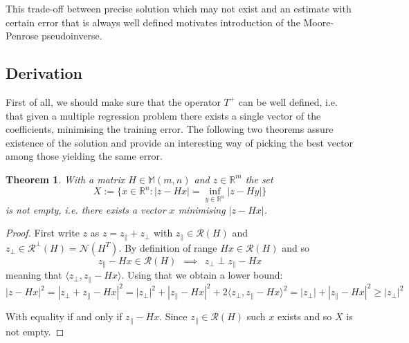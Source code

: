 \documentclass[a4paper,11pt]{article}
\theoremstyle{break}
\newtheorem{theorem}{Theorem}[section]
\newcommand{\R}{\mathbb{R}}
\newcommand{\Nu}{\mathcal{N}}
\newcommand{\Ra}{\mathcal{R}}
\newcommand{\Mat}[2]{\mathbb{M}(#1, #2)}
\newcommand{\pll}{\parallel}
\begin{document}
This trade-off between precise solution which may not exist and an estimate with certain error that is always well defined motivates introduction of the Moore-Penrose pseudoinverse.

\subsection{Derivation}
First of all, we should make sure that the operator $T^+$ can be well defined, i.e. that given a multiple regression problem there exists a single vector of the  coefficients, minimising the training error.
The following two theorems assure existence of the solution and provide an interesting way of picking the best vector among those yielding the same error.

\begin{theorem}\label{thm:regression_existence}
With a matrix $H \in \Mat{m}{n}$ and $z \in \R^m$ the set
\begin{equation*}
    X := \{ x \in \R^n : | z - H x | = \inf\limits_{y \in \R^n} | z - H y | \}
\end{equation*}
        is not empty, i.e. there exists a vector $x$ minimising $| z - H x |$.
\end{theorem}
\begin{proof} %
    First write $z$ as $z = z_\pll + z_\perp$ with $z_\pll \in \Ra(H)$ and $z_\perp \in \Ra^\perp(H) = \Nu(H^T)$.
    By definition of range $H x \in \Ra(H)$ and so
    $$ z_\pll - H x \in \Ra(H) ~~ \implies ~~ z_\perp \perp z_\pll - H x $$
    meaning that $\langle z_\perp, z_\pll - H x \rangle$. Using that we obtain a lower bound:
    \begin{equation}\label{eq:upper_bound}
    | z - H x |^2 = | z_\perp + z_\pll - H x |^2 =
    | z_\perp |^2 + | z_\pll - H x |^2 + 2 \langle z_\perp, z_\pll - H x \rangle^2 = 
    | z_\perp | + | z_\pll - H x |^2 \geq | z_\perp |^2
    \end{equation}
    
    With equality if and only if $ z_\pll - H x $. Since $ z_\pll \in \Ra(H)$ such $x$ exists and so $X$ is not empty.
\end{proof}
\end{document}
